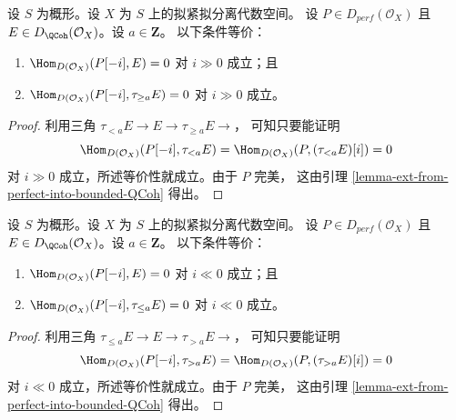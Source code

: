 \begin{lemma}
\label{lemma-bounded-truncation}
设 $S$ 为概形。设 $X$ 为 $S$ 上的拟紧拟分离代数空间。
设 $P \in D_{perf}(\mathcal{O}_X)$ 且
$E \in D_{\QCoh}(\mathcal{O}_X)$。设 $a \in \mathbf{Z}$。
以下条件等价：
\begin{enumerate}
\item $\Hom_{D(\mathcal{O}_X)}(P[-i], E) = 0$
对 $i \gg 0$ 成立；且
\item $\Hom_{D(\mathcal{O}_X)}(P[-i], \tau_{\geq a} E) = 0$
对 $i \gg 0$ 成立。
\end{enumerate}
\end{lemma}

\begin{proof}
利用三角 $ \tau_{< a} E \to E \to \tau_{\geq a} E \to$，
可知只要能证明
$$
\Hom_{D(\mathcal{O}_X)}(P[-i], \tau_{< a} E) =
\Hom_{D(\mathcal{O}_X)}(P, (\tau_{< a} E)[i]) = 0
$$
对 $i \gg 0$ 成立，所述等价性就成立。由于 $P$ 完美，
这由引理 \ref{lemma-ext-from-perfect-into-bounded-QCoh} 得出。
\end{proof}

\begin{lemma}
\label{lemma-bounded-below-truncation}
设 $S$ 为概形。设 $X$ 为 $S$ 上的拟紧拟分离代数空间。
设 $P \in D_{perf}(\mathcal{O}_X)$ 且
$E \in D_{\QCoh}(\mathcal{O}_X)$。设 $a \in \mathbf{Z}$。
以下条件等价：
\begin{enumerate}
\item $\Hom_{D(\mathcal{O}_X)}(P[-i], E) = 0$
对 $i \ll 0$ 成立；且
\item $\Hom_{D(\mathcal{O}_X)}(P[-i], \tau_{\leq a} E) = 0$
对 $i \ll 0$ 成立。
\end{enumerate}
\end{lemma}

\begin{proof}
利用三角 $ \tau_{\leq a} E \to E \to \tau_{> a} E \to$，
可知只要能证明
$$
\Hom_{D(\mathcal{O}_X)}(P[-i], \tau_{> a} E) =
\Hom_{D(\mathcal{O}_X)}(P, (\tau_{> a} E)[i]) = 0
$$
对 $i \ll 0$ 成立，所述等价性就成立。由于 $P$ 完美，
这由引理 \ref{lemma-ext-from-perfect-into-bounded-QCoh} 得出。
\end{proof}

